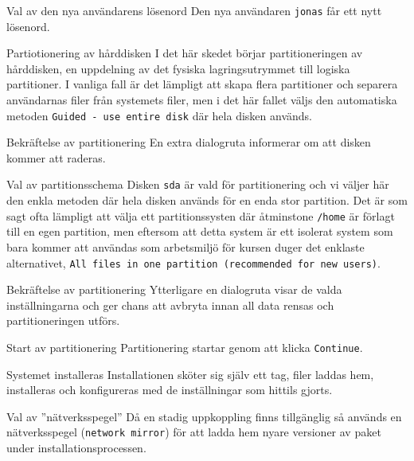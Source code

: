            {Val av den nya användarens lösenord}
           {Den nya användaren \texttt{jonas} får ett nytt lösenord.}
           {}

           {Partiotionering av hårddisken}
           {I det här skedet börjar partitioneringen av hårddisken, en
            uppdelning av det fysiska lagringsutrymmet till logiska
            partitioner. I vanliga fall är det lämpligt att skapa flera
            partitioner och separera användarnas filer från systemets filer,
            men i det här fallet väljs den automatiska metoden
            \texttt{Guided - use entire disk} där hela disken används.}
           {}

           {Bekräftelse av partitionering}
           {En extra dialogruta informerar om att disken kommer att raderas.}
           {}

           {Val av partitionsschema}
           {Disken \texttt{sda} är vald för partitionering och vi väljer här
            den enkla metoden där hela disken används för en enda stor partition.
            Det är som sagt ofta lämpligt att välja ett partitionssysten där
            åtminstone \texttt{/home} är förlagt till en egen partition, men
            eftersom att detta system är ett isolerat system som bara kommer
            att användas som arbetsmiljö för kursen duger det enklaste alternativet,
            \texttt{All files in one partition (recommended for new users)}.
            }
           {}

           {Bekräftelse av partitionering}
           {Ytterligare en dialogruta visar de valda inställningarna och ger
            chans att avbryta innan all data rensas och partitioneringen utförs.}
           {}

           {Start av partitionering}
           {Partitionering startar genom att klicka \texttt{Continue}.}
           {}

           {Systemet installeras}
           {Installationen sköter sig själv ett tag, filer laddas hem, installeras
            och konfigureras med de inställningar som hittils gjorts.}
           {}

           {Val av ''nätverksspegel''}
           {Då en stadig uppkoppling finns tillgänglig så används en
            nätverksspegel (\texttt{network mirror}) för att ladda hem nyare
            versioner av paket under installationsprocessen.}
           {}

